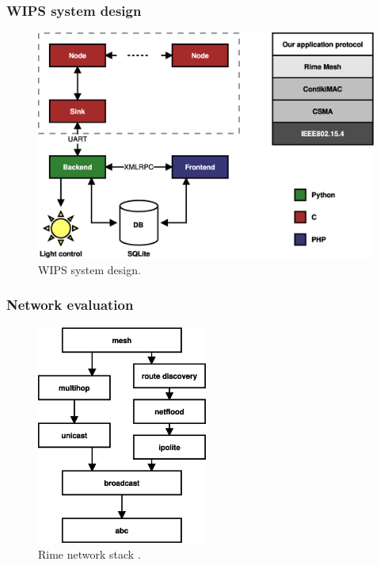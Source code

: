 \documentclass{beamer}
\begin{document}
\begin{frame}
\frametitle{WIPS system design}

	\begin{center}
		\begin{figure}
			\includegraphics[width=\textwidth]{design.eps}
			\caption{WIPS system design.}
		\end{figure}
	\end{center}

\end{frame}

\begin{frame}
\frametitle{Network evaluation}

	\begin{center}
		\begin{figure}
			\includegraphics[width=0.5\textwidth]{rimelite.eps}
			\caption{Rime network stack \cite{rime}.}
		\end{figure}
	\end{center}

\end{frame}
\end{document}
